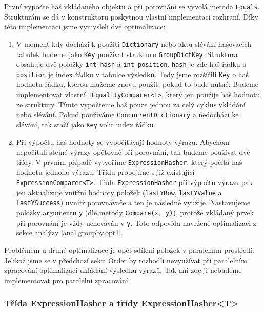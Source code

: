 První vypočte haš vkládaného objektu a při porovnání se vyvolá metoda \texttt{Equals}.
Strukturám se dá v konstruktoru poskytnou vlastní implementaci rozhraní.
Díky této implementaci jsme vymysleli dvě optimalizace:
\begin{enumerate}
\item V moment kdy dochází k použití \texttt{Dictionary} nebo aktu slévání hašovacích tabulek budeme jako \texttt{Key} používat strukturu \texttt{GroupDictKey}.
Struktura obsahuje dvě položky \texttt{int hash} a \texttt{int position}. 
\texttt{hash} je zde haš řádku a \texttt{position} je index řádku v tabulce výsledků.
Tedy jsme rozšířili \texttt{Key} o haš hodnotu řádku, kterou můžeme znovu použít, pokud to bude nutné.
Budeme implementovat vlastní \texttt{IEqualityComparer<T>}, který jen použije haš hodnotu ze struktury.
Tímto vypočteme haš pouze jednou za celý cyklus vkládání nebo slévání.
Pokud používáme \texttt{ConcurrentDictionary} a nedochází ke slévání, tak stačí jako \texttt{Key} volit index řádku.
\item Při výpočtu haš hodnoty se vypočítávají hodnoty výrazů.
Abychom nepočítali stejné výrazy opětovně při porovnání, tak budeme používat dvě třídy.
V prvním případě vytvoříme \texttt{ExpressionHasher}, který počítá haš hodnotu jednoho výrazu.
Třídu propojíme s již existující \texttt{ExpressionComparer<T>}.
Třída \texttt{ExpressionHasher} při výpočtu výrazu pak jen aktualizuje vnitřní hodnoty položek (\texttt{lastYRow}, \texttt{lastYValue} a \texttt{lastYSuccess}) uvnitř porovnávače a ten je následně využije.
Nastavujeme položky argumentu \texttt{y} (dle metody \texttt{Compare(x, y)}), protože vkládaný prvek při porovnání je vždy uchováván v \texttt{y}.
Toto odpovída navržené optimalizaci z sekce analýzy \ref{anal.groupby.opt1}.
\end{enumerate}
Problémem u druhé optimalizace je opět sdílení položek v paralelním prostředí.
Jelikož jsme se v předchozí sekci Order by rozhodli nevyužívat při paralelním zpracování optimalizaci ukládání výsledků výrazů.
Tak ani zde ji nebudeme implementovat pro paralelní zpracování. 

\subsubsection{Třída ExpressionHasher a třídy ExpressionHasher<T>}

